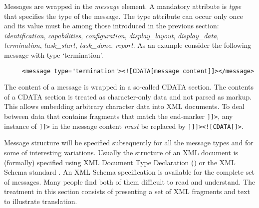 \documentclass{article}
\begin{document}
    \noindent Messages are wrapped in the \textit{message} element. A mandatory
    attribute is \textit{type} that specifies the type of the message. The type
    attribute can occur only once and its value must be among those introduced
    in the previous section: \textit{identification}, \textit{capabilities},
    \textit{configuration}, \textit{display\_layout}, \textit{display\_data},
    \textit{termination}, \textit{task\_start}, \textit{task\_done},
    \textit{report}. As an example consider the following message with type
    `termination'.
 
    \begin{verbatim}
     <message type="termination"><![CDATA[message content]]></message>\end{verbatim}

    \noindent The content of a message is wrapped in a so-called CDATA section. The
    contents of a CDATA section is treated as character-only data and not
    parsed as markup. This allows embedding arbitrary character data into XML
    documents. To deal between data that contains fragments that match the
    end-marker \verb']]>', any instance of \verb']]>' in the message content
    \textit{must} be replaced by \verb']]]><![CDATA[]>'.
    
    \noindent Message structure will be specified subsequently for all the
    message types and for some of interesting variations. Usually the structure
    of an XML document is (formally) specified using XML Document Type
    Declaration (\cite{Sperberg-McQueen:06:EML}) or the XML Schema standard
    \cite{Malhotra:06:XSP}. An XML Schema specification is available for the
    complete set of messages. Many people find both of them difficult to read
    and understand. The treatment in this section consists of presenting a set
    of XML fragments and text to illustrate translation.


   
\end{document}
